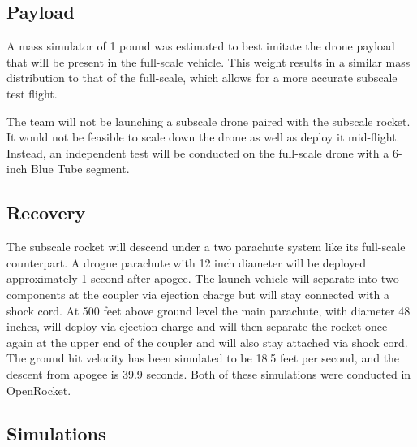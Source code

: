     \subsection{Payload}
 A mass simulator of 1 pound was estimated to best imitate the drone payload that will be present in the full-scale vehicle. This weight results in a similar mass distribution to that of the full-scale, which allows for a more accurate subscale test flight. 

The team will not be launching a subscale drone paired with the subscale rocket. It would not be feasible to scale down the drone as well as deploy it mid-flight. Instead, an independent test will be conducted on the full-scale drone with a 6-inch Blue Tube segment.
   
    \subsection{Recovery}
The subscale rocket will descend under a two parachute system like its full-scale counterpart. A drogue parachute with 12 inch diameter will be deployed approximately 1 second after apogee. The launch vehicle will separate into two components at the coupler via ejection charge but will stay connected with a shock cord. At 500 feet above ground level the main parachute, with diameter 48 inches, will deploy via ejection charge and will then separate the rocket once again at the upper end of the coupler and will also stay attached via shock cord. The ground hit velocity has been simulated to be 18.5 feet per second, and the descent from apogee is 39.9 seconds. Both of these simulations were conducted in OpenRocket. 

    \subsection{Simulations}
    
